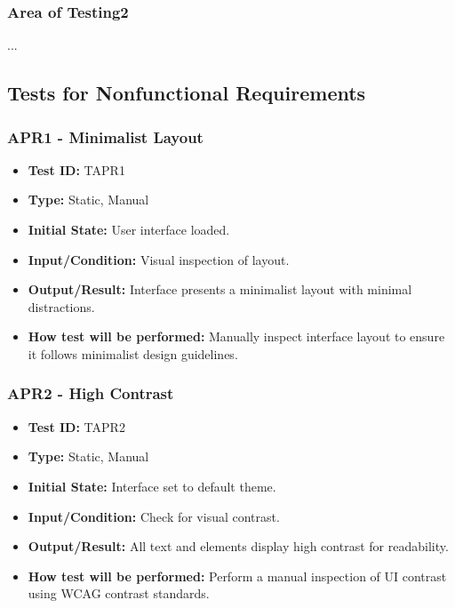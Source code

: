 \documentclass[12pt, titlepage]{article}
\begin{document}
\subsubsection{Area of Testing2}

...

\subsection{Tests for Nonfunctional Requirements}

\subsubsection{APR1 - Minimalist Layout}
\begin{itemize}
    \item \textbf{Test ID:} TAPR1
    \item \textbf{Type:} Static, Manual
    \item \textbf{Initial State:} User interface loaded.
    \item \textbf{Input/Condition:} Visual inspection of layout.
    \item \textbf{Output/Result:} Interface presents a minimalist layout with minimal distractions.
    \item \textbf{How test will be performed:} Manually inspect interface layout to ensure it follows minimalist design guidelines.
\end{itemize}

\subsubsection{APR2 - High Contrast}
\begin{itemize}
    \item \textbf{Test ID:} TAPR2
    \item \textbf{Type:} Static, Manual
    \item \textbf{Initial State:} Interface set to default theme.
    \item \textbf{Input/Condition:} Check for visual contrast.
    \item \textbf{Output/Result:} All text and elements display high contrast for readability.
    \item \textbf{How test will be performed:} Perform a manual inspection of UI contrast using WCAG contrast standards.
\end{itemize}
\end{document}
